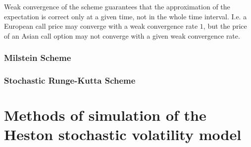                 \begin{remark}
                    Weak convergence of the scheme guarantees that the approximation of the expectation is correct only at a given time, not in the whole time interval. I.e. a European call price may converge with a weak convergence rate $1$, but the price of an Asian call option may not converge with a given weak convergence rate.
                \end{remark}

            \subsection{Milstein Scheme}

            \subsection{Stochastic Runge-Kutta Scheme}
                

\chapter{Methods of simulation of the Heston stochastic volatility model}
